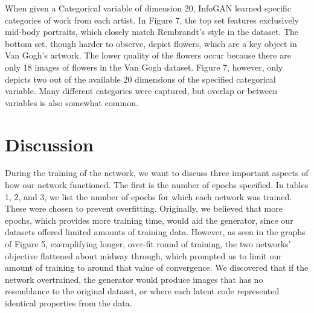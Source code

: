 \documentclass[conference,11pt]{IEEEtran}
\begin{document}
When given a Categorical variable of dimension 20, InfoGAN learned specific categories of work from each artist.  In Figure 7, the top set features exclusively mid-body portraits, which closely match Rembrandt's style in the dataset.  The bottom set, though harder to observe, depict flowers, which are a key object in Van Gogh's artwork.  The lower quality of the flowers occur because there are only 18 images of flowers in the Van Gogh dataset.  Figure 7, however, only depicts two out of the available 20 dimensions of the specified categorical variable.  Many different categories were captured, but overlap or between variables is also somewhat common.

\begin{table}[h]
\centering
\caption{Hyperparameters for Art Dataset}
\end{table}

\section{Discussion}

During the training of the network, we want to discuss three important aspects of how our network functioned. The first is the number of epochs specified.  In tables 1, 2, and 3, we list the number of epochs for which each network was trained. These were chosen to prevent overfitting. Originally, we believed that more epochs, which provides more training time, would aid the generator, since our datasets offered limited amounts of training data.  However, as seen in the graphs of Figure 5, exemplifying longer, over-fit round of training, the two networks' objective flattened about midway through, which prompted us to limit our amount of training to around that value of convergence.  We discovered that if the network overtrained, the generator would produce images that has no resemblance to the original dataset, or where each latent code represented identical properties from the data.
\end{document}
